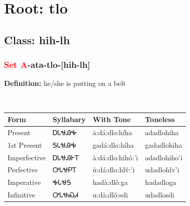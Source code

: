 \needspace{4in}
\section*{Root: tlo}
\nopagebreak
{}
\needspace{3in}
\subsection*{Class: hih-lh}
\nopagebreak
\needspace{2in}
\subsubsection*{\textcolor{Red}{Set A}{-}ata{-}\textbf{tlo}{-}[hih-lh]}
\nopagebreak
\textbf{Definition: } he/she is putting on a belt
\\[0.5em]
\begin{tabularx}{\textwidth}{l X X X}%
\toprule%
\textbf{Form}&\textbf{Syllabary}&\textbf{With Tone}&\textbf{Toneless}\\%
\midrule%
Present&ᎠᏓᏠᎯᎭ&à:dá:dlo:híha&adadlohiha\\%
1st Present&ᎦᏓᏠᎯᎭ&gadá:dlo:híha&gadadlohiha\\%
Imperfective&ᎠᏓᏠᎯᎰᎢ&à:dá:dlo:hihó:’i&adadlohiho’i\\%
Perfective&ᎤᏓᏠᏢᎢ&ù:dá:dlo:hlv̌:’i&udadlohlv’i\\%
Imperative&ᎭᏓᏠᎦ&hadà:dlǒ:ga&hadadloga\\%
Infinitive&ᎤᏓᏠᏍᏗ&u:dà:dlǒ:sdi&udadlosdi\\%
\bottomrule%
\end{tabularx}
\\[1em]